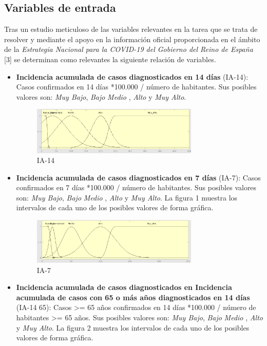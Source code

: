 \documentclass[12pt,a4paper, xcolor=table]{article}
\begin{document}
\subsection{Variables de entrada}
Tras un estudio meticuloso de las variables relevantes en la tarea que se trata de resolver y mediante el apoyo en la información oficial proporcionada en el ámbito de la \textit{Estrategia Nacional para la COVID-19 del Gobierno del Reino de España} [3] se determinan como relevantes la siguiente relación de variables.

\begin{itemize}

    \item \textbf{Incidencia acumulada de casos diagnosticados en 14 días} (IA-14): Casos confirmados en 14 días *100.000 / número de habitantes. Sus posibles valores son: \textit{Muy Bajo}, \textit{Bajo} \textit{Medio }, {\textit{Alto}} y {\textit{Muy Alto}}.

    \begin{figure}[!h]
      \centering
      \includegraphics[width=300px]{img/ia_ac_14.png}
      \caption{IA-14}
    \end{figure}

    \item \textbf{Incidencia acumulada de casos diagnosticados en 7 días} (IA-7): Casos confirmados en 7 días *100.000 / número de habitantes. Sus posibles valores son: \textit{Muy Bajo}, \textit{Bajo} \textit{Medio }, {\textit{Alto}} y {\textit{Muy Alto}}. La figura 1 muestra los intervalos de cada uno de los posibles valores de forma gráfica.
    
    \begin{figure}[!h]
      \centering
      \includegraphics[width=300px]{img/ia_ac_7.png}
      \caption{IA-7}
    \end{figure}

    \item \textbf{Incidencia acumulada de casos diagnosticados en Incidencia acumulada de casos con 65 o más años diagnosticados en 14 días} (IA-14 65): Casos >= 65 años confirmados en 14 días *100.000 / número de habitantes >= 65 años. Sus posibles valores son: \textit{Muy Bajo}, \textit{Bajo} \textit{Medio }, {\textit{Alto}} y {\textit{Muy Alto}}. La figura 2 muestra los intervalos de cada uno de los posibles valores de forma gráfica.
    

\end{itemize}
\end{document}
